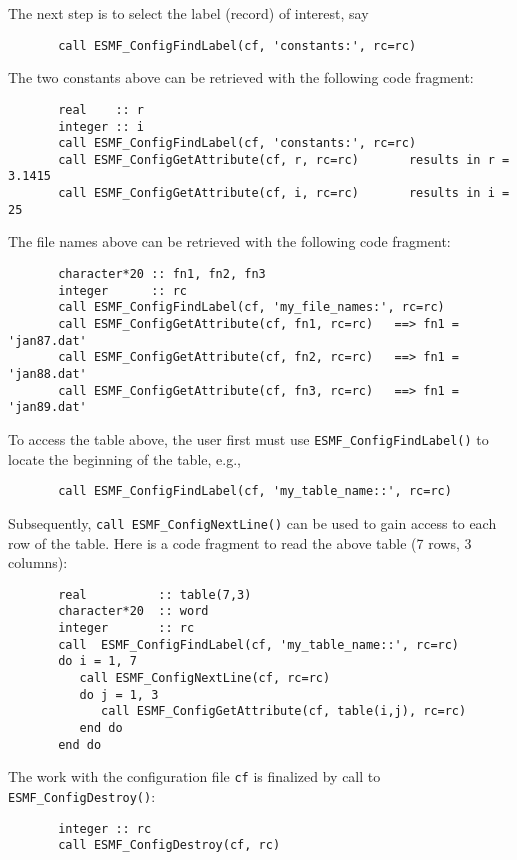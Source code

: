     The next step is to select the label (record) of interest, say

 \begin{verbatim}
       call ESMF_ConfigFindLabel(cf, 'constants:', rc=rc)
 \end{verbatim}

  The two constants above can be retrieved with the following code
  fragment:
 \begin{verbatim}
       real    :: r
       integer :: i
       call ESMF_ConfigFindLabel(cf, 'constants:', rc=rc)
       call ESMF_ConfigGetAttribute(cf, r, rc=rc)       results in r = 3.1415
       call ESMF_ConfigGetAttribute(cf, i, rc=rc)       results in i = 25
 \end{verbatim}

  The file names above can be retrieved with the following
  code fragment:
 \begin{verbatim}
       character*20 :: fn1, fn2, fn3
       integer      :: rc
       call ESMF_ConfigFindLabel(cf, 'my_file_names:', rc=rc)
       call ESMF_ConfigGetAttribute(cf, fn1, rc=rc)   ==> fn1 = 'jan87.dat'
       call ESMF_ConfigGetAttribute(cf, fn2, rc=rc)   ==> fn1 = 'jan88.dat'
       call ESMF_ConfigGetAttribute(cf, fn3, rc=rc)   ==> fn1 = 'jan89.dat'
 \end{verbatim}

 To access the table above, the user first must use 
 {\tt ESMF\_ConfigFindLabel()} to locate the beginning of the table, e.g.,

 \begin{verbatim}
       call ESMF_ConfigFindLabel(cf, 'my_table_name::', rc=rc)
 \end{verbatim}

 Subsequently, {\tt call ESMF\_ConfigNextLine()} can be used to gain 
 access to each row of the table. Here is a code fragment to read the above
 table (7 rows, 3 columns):

 \begin{verbatim}
       real          :: table(7,3)
       character*20  :: word
       integer       :: rc
       call  ESMF_ConfigFindLabel(cf, 'my_table_name::', rc=rc)
       do i = 1, 7
          call ESMF_ConfigNextLine(cf, rc=rc)
          do j = 1, 3
             call ESMF_ConfigGetAttribute(cf, table(i,j), rc=rc)
          end do                   
       end do
 \end{verbatim}

 The work with the configuration file {\tt cf} is finalized by call to
 {\tt ESMF\_ConfigDestroy()}:
 \begin{verbatim}
       integer :: rc
       call ESMF_ConfigDestroy(cf, rc)
 \end{verbatim}

